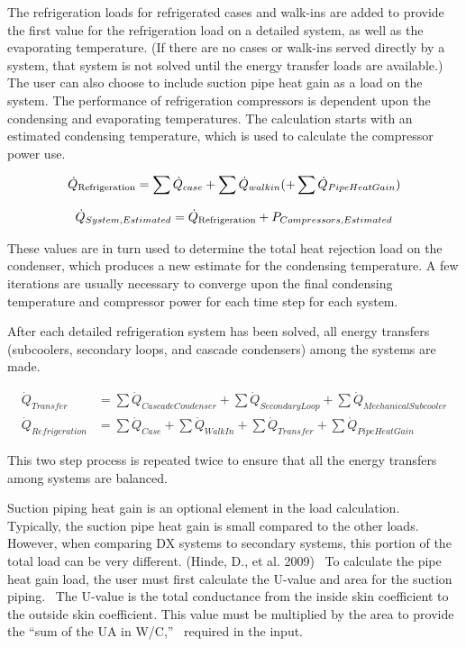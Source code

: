 The refrigeration loads for refrigerated cases and walk-ins are added to provide the first value for the refrigeration load on a detailed system, as well as the evaporating temperature. (If there are no cases or walk-ins served directly by a system, that system is not solved until the energy transfer loads are available.) The user can also choose to include suction pipe heat gain as a load on the system. The performance of refrigeration compressors is dependent upon the condensing and evaporating temperatures. The calculation starts with an estimated condensing temperature, which is used to calculate the compressor power use.

\begin{equation}
{\dot Q_{{\rm{Refrigeration}}}} = \sum {{{\dot Q}_{case}}}  + \sum {{{\dot Q}_{walkin}}} ( + \sum {{{\dot Q}_{PipeHeatGain}}} )
\end{equation}

\begin{equation}
{\dot Q_{System,Estimated}} = {\dot Q_{{\rm{Refrigeration}}}} + {P_{Compressors,Estimated}}
\end{equation}

These values are in turn used to determine the total heat rejection load on the condenser, which produces a new estimate for the condensing temperature. A few iterations are usually necessary to converge upon the final condensing temperature and compressor power for each time step for each system.

After each detailed refrigeration system has been solved, all energy transfers (subcoolers, secondary loops, and cascade condensers) among the systems are made.

\begin{equation}
  \begin{array}{rl}
    \dot{Q}_{Transfer} &= \sum \dot{Q}_{CascadeCondenser} + \sum \dot{Q}_{SecondaryLoop} + \sum \dot{Q}_{MechanicalSubcooler} \\
    \dot{Q}_{Refrigeration} &= \sum \dot{Q}_{Case} + \sum \dot{Q}_{WalkIn} + \sum \dot{Q}_{Transfer} + \sum \dot{Q}_{PipeHeatGain}
  \end{array}
\end{equation}

This two step process is repeated twice to ensure that all the energy transfers among systems are balanced.

Suction piping heat gain is an optional element in the load calculation.~ Typically, the suction pipe heat gain is small compared to the other loads.~ However, when comparing DX systems to secondary systems, this portion of the total load can be very different. (Hinde, D., et al. 2009) ~To calculate the pipe heat gain load, the user must first calculate the U-value and area for the suction piping.~ The U-value is the total conductance from the inside skin coefficient to the outside skin coefficient. This value must be multiplied by the area to provide the ``sum of the UA in W/C,''~ required in the input.

